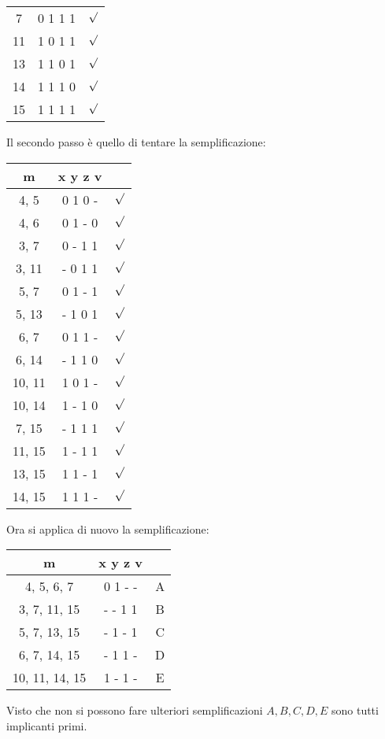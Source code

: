 \documentclass[a4paper]{article}
\theoremstyle{break}
\theoremstyle{break}
\theoremstyle{break}
\theoremstyle{break}
\begin{document}
\begin{example}
\begin{center}
\begin{tabular}{c|c|c}
                \hline
                7 & 0 1 1 1&\( \surd \) \\
                11 & 1 0 1 1&\( \surd \) \\
                13 & 1 1 0 1&\( \surd \) \\
                14 & 1 1 1 0&\( \surd \) \\
                \hline
                15 & 1 1 1 1&\( \surd \) \\
            \end{tabular}
        \end{center}
        Il secondo passo è quello di tentare la semplificazione:
        \begin{center}
            \begin{tabular}{c|c|c}
                m & x y z v& \\
                \hline
                4, 5 & 0 1 0 -& \( \surd \) \\
                4, 6 & 0 1 - 0& \( \surd \) \\
                \hline
                3, 7 & 0 - 1 1& \( \surd \) \\
                3, 11 & - 0 1 1& \( \surd \) \\
                5, 7 & 0 1 - 1& \( \surd \) \\
                5, 13 & - 1 0 1& \( \surd \) \\
                6, 7 & 0 1 1 -& \( \surd \) \\
                6, 14 & - 1 1 0& \( \surd \) \\
                10, 11 & 1 0 1 -& \( \surd \) \\
                10, 14 & 1 - 1 0& \( \surd \) \\
                \hline
                7, 15 & - 1 1 1& \( \surd \) \\
                11, 15 & 1 - 1 1& \( \surd \) \\
                13, 15 & 1 1 - 1& \( \surd \) \\
                14, 15 & 1 1 1 -& \( \surd \) \\
            \end{tabular}
        \end{center}
        Ora si applica di nuovo la semplificazione:
        \begin{center}
            \begin{tabular}{c|c|c}
                m & x y z v&\\
                \hline
                4, 5, 6, 7 & 0 1 - -& A\\
                \hline
                3, 7, 11, 15 & - - 1 1& B\\
                5, 7, 13, 15 & - 1 - 1& C\\
                6, 7, 14, 15 & - 1 1 -& D\\
                10, 11, 14, 15 & 1 - 1 -& E\\
            \end{tabular}
        \end{center}
        Visto che non si possono fare ulteriori semplificazioni \( A, B, C, D, E \)
        sono tutti implicanti primi.


\end{example}
\end{document}
